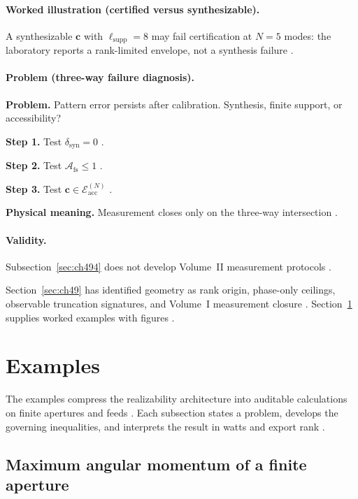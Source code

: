 \paragraph{Worked illustration (certified versus synthesizable).}
A synthesizable \(\mathbf{c}\) with \(\ell_{\mathrm{supp}}=8\) may fail certification at \(N=5\) modes: the laboratory reports a
rank-limited envelope, not a synthesis failure \cite{harrington2001,hansen1988}.

\paragraph{Problem (three-way failure diagnosis).}
\textbf{Problem.} Pattern error persists after calibration. Synthesis, finite support, or accessibility?

\textbf{Step 1.} Test \(\delta_{\mathrm{syn}}=0\) \cite{stratton1941,harrington2001}.

\textbf{Step 2.} Test \(\mathcal{A}_{\mathrm{fs}}\le1\) \cite{hansen1988}.

\textbf{Step 3.} Test \(\mathbf{c}\in\mathcal{E}_{\mathrm{acc}}^{(N)}\) \cite{devaney2004}.

\textbf{Physical meaning.} Measurement closes only on the three-way intersection \cite{stratton1941}.

\paragraph{Validity.}
Subsection~\ref{sec:ch494} does not develop Volume~II measurement protocols \cite{harrington2001}.

Section~\ref{sec:ch49} has identified geometry as rank origin, phase-only ceilings, observable truncation signatures, and Volume~I
measurement closure \cite{stratton1941,hansen1988,harrington2001}. Section~\ref{sec:ch410} supplies worked examples with figures
\cite{devaney2004}.


\section{Examples}
\label{sec:ch410}

The examples compress the realizability architecture into auditable calculations on finite apertures and feeds
\cite{stratton1941,harrington2001,hansen1988}. Each subsection states a problem, develops the governing inequalities, and interprets
the result in watts and export rank \cite{devaney2004}.


\subsection{Maximum angular momentum of a finite aperture}
\label{sec:ch4101}

